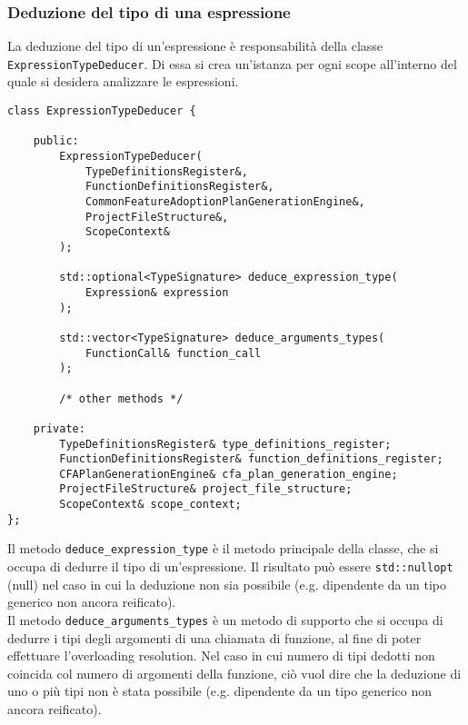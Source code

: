 \subsubsection{Deduzione del tipo di una espressione}
La deduzione del tipo di un'espressione è responsabilità della classe \texttt{ExpressionTypeDeducer}. 
Di essa si crea un'istanza per ogni scope all'interno del quale si desidera analizzare le espressioni. \\

\vspace{0.5cm}
\begin{lstlisting}[frame=single]
class ExpressionTypeDeducer {
    
    public:
        ExpressionTypeDeducer(
            TypeDefinitionsRegister&,
            FunctionDefinitionsRegister&,
            CommonFeatureAdoptionPlanGenerationEngine&,
            ProjectFileStructure&,
            ScopeContext&
        );

        std::optional<TypeSignature> deduce_expression_type(
            Expression& expression
        );

        std::vector<TypeSignature> deduce_arguments_types(
            FunctionCall& function_call
        );

        /* other methods */

    private:
        TypeDefinitionsRegister& type_definitions_register;
        FunctionDefinitionsRegister& function_definitions_register;
        CFAPlanGenerationEngine& cfa_plan_generation_engine;
        ProjectFileStructure& project_file_structure;
        ScopeContext& scope_context;
};
\end{lstlisting}
\vspace{0.5cm}

Il metodo \texttt{deduce\_expression\_type} è il metodo principale della classe, che si occupa di dedurre 
il tipo di un'espressione. Il risultato può essere \texttt{std::nullopt} (null) nel caso in cui la 
deduzione non sia possibile (e.g. dipendente da un tipo generico non ancora reificato). \\

Il metodo \texttt{deduce\_arguments\_types} è un metodo di supporto che si occupa di dedurre i tipi
degli argomenti di una chiamata di funzione, al fine di poter effettuare l'overloading resolution. Nel caso 
in cui numero di tipi dedotti non coincida col numero di argomenti della funzione, ciò vuol dire che la deduzione 
di uno o più tipi non è stata possibile (e.g. dipendente da un tipo generico non ancora reificato). \\

